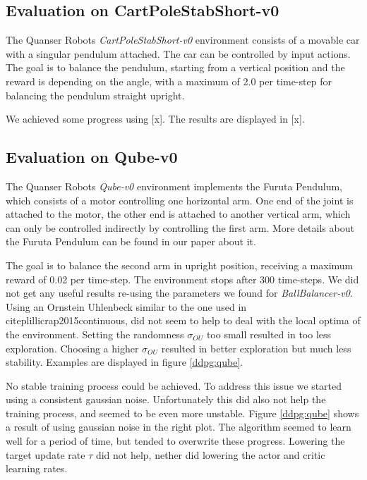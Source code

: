 \subsection{Evaluation on CartPoleStabShort-v0}
The Quanser Robots \textit{CartPoleStabShort-v0} environment consists of a movable car with a singular pendulum attached. The car can be controlled by input actions. The goal is to balance the pendulum, starting from a vertical position and the reward is depending on the angle, with a maximum of 2.0 per time-step for balancing the pendulum straight upright.

We achieved some progress using [x]. The results are displayed in [x].

\subsection{Evaluation on Qube-v0}
The Quanser Robots \textit{Qube-v0} environment implements the Furuta Pendulum, which consists of a motor controlling one horizontal arm. One end of the joint is attached to the motor, the other end is attached to another vertical arm, which can only be controlled indirectly by controlling the first arm. More details about the Furuta Pendulum can be found in our paper about it.

The goal is to balance the second arm in upright position, receiving a maximum reward of 0.02 per time-step. The environment stops after 300 time-steps. We did not get any useful results re-using the parameters we found for \textit{BallBalancer-v0}. Using an Ornstein Uhlenbeck similar to the one used in citep{lillicrap2015continuous}, did not seem to help to deal with the local optima of the environment. Setting the randomness $\sigma_{OU}$ too small resulted in too less exploration. Choosing a higher $\sigma_{OU}$ resulted in better exploration but much less stability. Examples are displayed in figure \ref{ddpg:qube}.

No stable training process could be achieved. To address this issue we started using a consistent gaussian noise. Unfortunately this did also not help the training process, and seemed to be even more unstable. Figure \ref{ddpg:qube} shows a result of using gaussian noise in the right plot. The algorithm seemed to learn well for a period of time, but tended to overwrite these progress. Lowering the target update rate $\tau$ did not help, nether did lowering the actor and critic learning rates.

